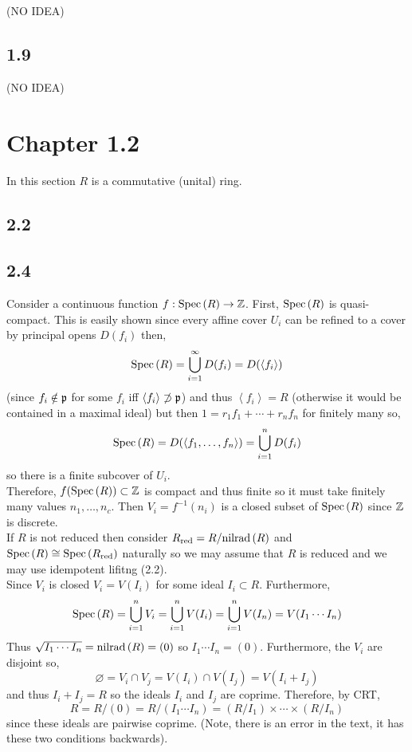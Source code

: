 \documentclass[12pt]{extarticle}
\begin{document}
(NO IDEA)

\subsection{1.9}

(NO IDEA)

\section{Chapter 1.2}

\begin{remark}
In this section $R$ is a commutative (unital) ring. 
\end{remark}

\subsection{2.2}

\subsection{2.4}

Consider a continuous function $f : \mathrm{Spec}\left( R \right) \to \mathbb{Z}$. First, $\mathrm{Spec}\left( R \right)$ is quasi-compact. This is easily shown since every affine cover $U_i$ can be refined to a cover by principal opens $D(f_i)$ then,
\[ \mathrm{Spec}\left( R \right) = \bigcup_{i = 1}^\infty D(f_i) = D( \left< f_i \right> ) \]
(since $f_i \notin \mathfrak{p}$ for some $f_i$ iff $\left< f_i \right> \not\supset \mathfrak{p}$) and thus $\left< f_i \right> = R$ (otherwise it would be contained in a maximal ideal) but then $1 = r_1 f_1 + \cdots + r_n f_n$ for finitely many so,
\[ \mathrm{Spec}\left( R \right) = D(\left< f_1, \dots, f_n \right>) = \bigcup_{ i = 1}^n D(f_i) \]
so there is a finite subcover of $U_i$. 
\bigskip\\
Therefore, $f(\mathrm{Spec}\left( R \right)) \subset \mathbb{Z}$ is compact and thus finite so it must take finitely many values $n_1, \dots, n_c$. Then $V_i = f^{-1}(n_i)$ is a closed subset of $\mathrm{Spec}\left( R \right)$ since $\mathbb{Z}$ is discrete. 
\bigskip\\
If $R$ is not reduced then consider $R_{\mathrm{red}} = R / \mathrm{nilrad}\left( R \right)$ and $\mathrm{Spec}\left( R \right) \cong \mathrm{Spec}\left( R_{\mathrm{red}} \right)$ naturally so we may assume that $R$ is reduced and we may use idempotent lifitng (2.2). 
\bigskip\\
Since $V_i$ is closed $V_i = V(I_i)$ for some ideal $I_i \subset R$. Furthermore,
\[ \mathrm{Spec}\left( R \right) = \bigcup_{i = 1}^n V_i = \bigcup_{i = 1}^n V(I_i) = \bigcup_{i = 1}^n V(I_n) = V(I_1 \cdots I_n) \]
Thus $\sqrt{I_1 \cdots I_n} = \mathrm{nilrad}\left( R \right) = (0)$ so $I_1 \cdots I_n = (0)$. Furthermore, the $V_i$ are disjoint so,
\[ \varnothing = V_i \cap V_j = V(I_i) \cap V(I_j) = V(I_i + I_j) \]
and thus $I_i + I_j = R$ so the ideals $I_i$ and $I_j$ are coprime. Therefore, by CRT,
\[ R = R/(0) = R / (I_1 \cdots I_n) = (R / I_1) \times \cdots \times (R / I_n) \]
since these ideals are pairwise coprime. (Note, there is an error in the text, it has these two conditions backwards). 
\end{document}
